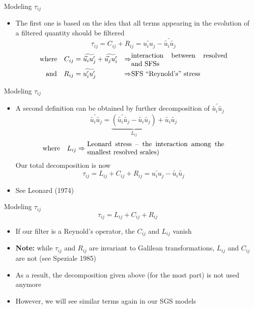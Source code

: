 \begin{frame}{Modeling $\tau_{ij}$}

\begin{itemize}
\item The first one is based on the idea that all terms appearing in the evolution of a filtered quantity should be filtered
$$\tau_{ij} = \boxed{C_{ij} + R_{ij}} = \widetilde{u_iu_j} - \widetilde{\widetilde{u_i}\widetilde{u_j}}$$
\begin{align*}
	\mbox{where}\quad C_{ij} &= \widetilde{\widetilde{u_i} u_j^{\prime}} + \widetilde{\widetilde{u_j} u_i^{\prime}} &\Rightarrow & \parbox{14em}{interaction between resolved and SFSs}\\
	\mbox{and} \quad R_{ij} &= \widetilde{u_i^{\prime}u_j^{\prime}} &\Rightarrow & \parbox{14em}{SFS ``Reynold's'' stress}
\end{align*}
\end{itemize}
\end{frame}

\begin{frame}{Modeling $\tau_{ij}$}

\begin{itemize}
\item A second definition can be obtained by further decomposition of $\widetilde{\widetilde{u_i}\widetilde{u_j}}$
$$\widetilde{\widetilde{u_i}\widetilde{u_j}} = \underbrace{\left( \widetilde{\widetilde{u_i}\widetilde{u_j}} - \widetilde{u_i} \widetilde{u_j}\right)}_{L_{ij}} + \widetilde{u_i} \widetilde{u_j}$$
$$\mbox{where}\quad L_{ij} \Rightarrow \parbox{20em}{Leonard stress -- the interaction among the smallest resolved scales)}$$
Our total decomposition is now $$\boxed{\tau_{ij} = L_{ij} + C_{ij} + R_{ij}} = \widetilde{u_iu_j} - \widetilde{u_i}\widetilde{u_j}$$
\item See Leonard (1974)
\end{itemize}
\end{frame}

\begin{frame}{Modeling $\tau_{ij}$}
$$\tau_{ij} = L_{ij} + C_{ij} + R_{ij}$$
\begin{itemize}
\item If our filter is a Reynold's operator, the $C_{ij}$ and $L_{ij}$ vanish
\item \textbf{Note:} while $\tau_{ij}$ and $R_{ij}$ are invariant to Galilean transformations, $L_{ij}$ and $C_{ij}$ are not (see Speziale 1985)
\item As a result, the decomposition given above (for the most part) is not used anymore
\item However, we will see similar terms again in our SGS models
\end{itemize}
\end{frame}

